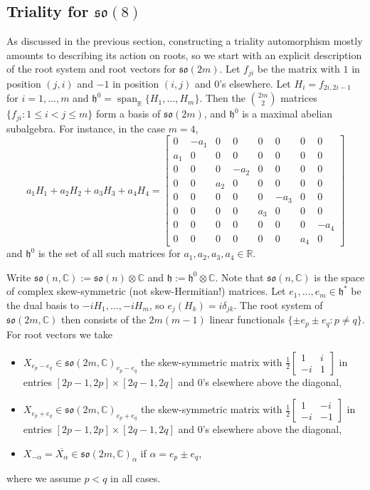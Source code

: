 \documentclass[reqno]{amsart}
\theoremstyle{definition} \newtheorem{example}[theorem]{Example}
\newcommand{\CC}{\mathbb{C}}
\newcommand{\RR}{\mathbb{R}}
\newcommand{\so}{\mathfrak{so}}
\newcommand{\vspan}{\operatorname{span}}
\newcommand{\h}{\mathfrak{h}}
\begin{document}
\subsection{Triality for $\so(8)$} \label{subsec:so8-triality}
As discussed in the previous section, constructing a triality automorphism mostly amounts to describing its action on roots, so we start with an explicit description of the root system and root vectors for $\so(2m)$. Let $f_{ji}$ be the matrix with $1$ in position $(j,i)$ and $-1$ in position $(i,j)$ and $0$'s elsewhere. Let $H_i = f_{2i,2i-1}$ for $i = 1, \ldots, m$ and $\h^0 = \vspan_{\RR} \{H_1, \ldots,H_m\}$. Then the ${2m \choose 2}$ matrices $\{f_{ji} : 1 \leq i < j \leq m\}$ form a basis of $\so(2m)$, and $\h^0$ is a maximal abelian subalgebra.  For instance, in the case $m = 4$,
\begin{equation*}
a_1 H_1 + a_2 H_2 + a_3 H_3 + a_4 H_4 = \left[\begin{smallmatrix}
0  & -a_1 & 0 & 0 & 0 & 0 & 0 & 0\\
a_1 & 0 & 0 & 0 & 0 & 0 & 0 & 0\\
0  & 0 & 0 & -a_2 & 0 & 0 & 0 & 0\\
0  & 0 & a_2 & 0 & 0 & 0 & 0 & 0\\
0  & 0 & 0 & 0 & 0 & -a_3 & 0 & 0\\
0  & 0 & 0 & 0 & a_3 & 0 & 0 & 0\\
0  & 0 & 0 & 0 & 0 & 0 & 0 & -a_4\\ 
0  & 0 & 0 & 0 & 0 & 0 & a_4 & 0
\end{smallmatrix}\right]
\end{equation*}
and $\h^0$ is the set of all such matrices for $a_1,a_2,a_3,a_4 \in \RR$.

Write $\so(n,\CC) := \so(n) \otimes \CC$ and $\h := \h^0 \otimes \CC$. Note that $\so(n,\CC)$ is the space of complex skew-symmetric (not skew-Hermitian!) matrices. Let $e_1, \ldots, e_m \in \h^*$ be the dual basis to $-iH_1,\ldots,-iH_m$,  so $e_j(H_k) = i\delta_{jk}$. The root system of $\so(2m,\CC)$ then consists of the $2m(m-1)$ linear functionals $\{\pm e_p \pm e_q : p \neq q\}$.  For root vectors we  take
\begin{itemize}
\item $X_{e_p-e_q} \in \so(2m,\CC)_{e_p-e_q}$ the skew-symmetric matrix with $\tfrac{1}{2}\left[ \begin{smallmatrix} 1 & i \\ -i & 1 \end{smallmatrix}\right]$ in entries $[2p-1,2p] \times [2q-1,2q]$ and $0$'s elsewhere above the diagonal,
\item $X_{e_p+e_q} \in \so(2m,\CC)_{e_p+e_q}$ the skew-symmetric matrix with $\tfrac{1}{2}\left[ \begin{smallmatrix} 1 & -i \\ -i & -1 \end{smallmatrix}\right]$ in entries $[2p-1,2p] \times [2q-1,2q]$ and $0$'s elsewhere above the diagonal,
\item $X_{-\alpha} = \overline{X_{\alpha}} \in \so(2m,\CC)_{\alpha}$ if $\alpha = e_p\pm e_q$,
\end{itemize}
where we assume $p < q$ in all cases.
\end{document}
